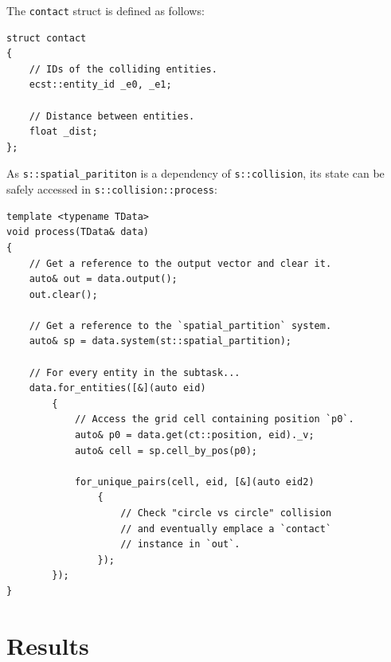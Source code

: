 \documentclass[twoside, 12pt, a4paper, openany]{book}
\begin{document}
The
\texttt{contact}
struct is defined as follows:

\begin{verbatim}
struct contact
{
    // IDs of the colliding entities.
    ecst::entity_id _e0, _e1;

    // Distance between entities.
    float _dist;
};
\end{verbatim}

As
\texttt{s::spatial_parititon}
is a dependency of
\texttt{s::collision},
its state can be safely accessed in
\texttt{s::collision::process}:

\begin{verbatim}
template <typename TData>
void process(TData& data)
{
    // Get a reference to the output vector and clear it.
    auto& out = data.output();
    out.clear();

    // Get a reference to the `spatial_partition` system.
    auto& sp = data.system(st::spatial_partition);

    // For every entity in the subtask...
    data.for_entities([&](auto eid)
        {
            // Access the grid cell containing position `p0`.
            auto& p0 = data.get(ct::position, eid)._v;
            auto& cell = sp.cell_by_pos(p0);

            for_unique_pairs(cell, eid, [&](auto eid2)
                {
                    // Check "circle vs circle" collision
                    // and eventually emplace a `contact`
                    // instance in `out`.
                });
        });
}
\end{verbatim}

\chapter{Results}\label{results}
\end{document}
